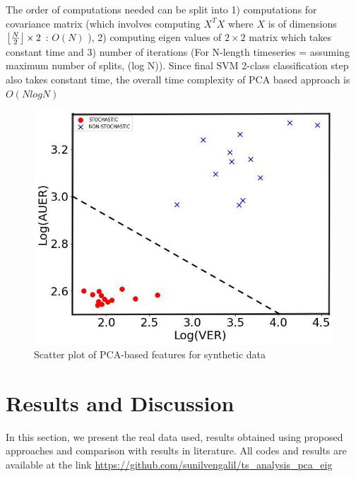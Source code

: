 \documentclass[journal]{IEEEtran}
\DeclarePairedDelimiter\floor{\lfloor}{\rfloor}
\begin{document}
	The order of computations needed can be split into 1) computations for covariance matrix (which involves computing $X^TX$  where $X$ is of dimensions $ {\floor*{\frac{N}{2}}} \times 2$ : $O(N)$ ), 2) computing eigen values of $2\times 2$ matrix which takes constant time and 3) number of iterations  (For N-length timeseries = assuming maximum number of splits, (log N)). Since final SVM 2-class classification step also takes constant time, the overall time complexity of PCA based approach is $O(NlogN)$
	\begin{figure}[h]
		\centering
		\includegraphics[width=0.7\linewidth]{Scatterplot_poc_variance_area_threshold_7.jpg}
		\caption{Scatter plot of PCA-based features for synthetic data}
		\label{scatterplot}
	\end{figure}
	
	
	
	\section{Results and Discussion} \label{rnd}
	In this section, we present the real data used, results obtained using proposed approaches and comparison with results in literature. All codes and results are available at the link \href{https://github.com/sunilvengalil/ts_analysis_pca_eig}{https://github.com/sunilvengalil/ts\_analysis\_pca\_eig}
	
\end{document}

